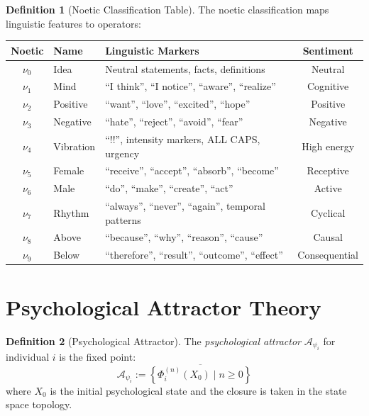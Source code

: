 \documentclass[11pt,twoside]{book}
\renewcommand{\arraystretch}{1.2}
\theoremstyle{definition}
\newtheorem{definition}{Definition}[chapter]
\theoremstyle{plain}
\theoremstyle{remark}
\newcommand{\noe}[1]{\nu_{#1}}
\newcommand{\Frac}{\Phi}
\newcommand{\PsychAttractor}{\mathcal{A}_\psi}
\begin{document}
\begin{definition}[Noetic Classification Table]
\label{def:noetic-table}
The noetic classification maps linguistic features to operators:

\begin{center}
\small
\renewcommand{\arraystretch}{1.3}
\begin{tabularx}{\textwidth}{c|l|X|c}
\toprule
\textbf{Noetic} & \textbf{Name} & \textbf{Linguistic Markers} & \textbf{Sentiment} \\
\midrule
$\noe{0}$ & Idea & Neutral statements, facts, definitions & Neutral \\
$\noe{1}$ & Mind & ``I think'', ``I notice'', ``aware'', ``realize'' & Cognitive \\
$\noe{2}$ & Positive & ``want'', ``love'', ``excited'', ``hope'' & Positive \\
$\noe{3}$ & Negative & ``hate'', ``reject'', ``avoid'', ``fear'' & Negative \\
$\noe{4}$ & Vibration & ``!!'', intensity markers, ALL CAPS, urgency & High energy \\
$\noe{5}$ & Female & ``receive'', ``accept'', ``absorb'', ``become'' & Receptive \\
$\noe{6}$ & Male & ``do'', ``make'', ``create'', ``act'' & Active \\
$\noe{7}$ & Rhythm & ``always'', ``never'', ``again'', temporal patterns & Cyclical \\
$\noe{8}$ & Above & ``because'', ``why'', ``reason'', ``cause'' & Causal \\
$\noe{9}$ & Below & ``therefore'', ``result'', ``outcome'', ``effect'' & Consequential \\
\bottomrule
\end{tabularx}
\end{center}
\end{definition}

\section{Psychological Attractor Theory}

\begin{definition}[Psychological Attractor]
\label{def:psych-attractor}
The \emph{psychological attractor} $\PsychAttractor_i$ for individual $i$ is the fixed point:
\[
    \PsychAttractor_i := \overline{\left\{ \Frac_i^{(n)}(X_0) \mid n \geq 0 \right\}}
\]
where $X_0$ is the initial psychological state and the closure is taken in the state space topology.
\end{definition}
\end{document}
